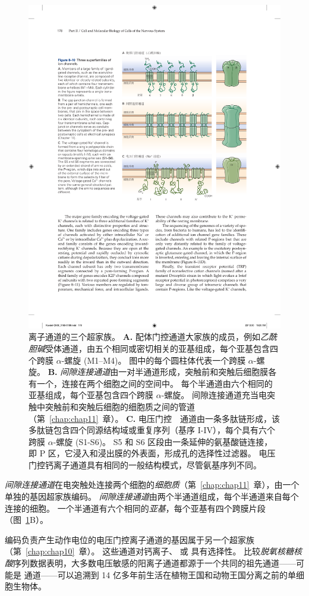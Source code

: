 \begin{figure}[htbp]
	\centering
	\includegraphics[width=0.7\linewidth]{chap08/fig_8_10}
	\caption{离子通道的三个超家族。 
		\textbf{A.} 配体门控通道大家族的成员，例如\textit{乙酰胆碱}受体通道，由五个相同或密切相关的亚基组成，每个亚基包含四个跨膜 $\alpha$-螺旋 (M1–M4)。
		图中的每个圆柱体代表一个跨膜 $\alpha$-螺旋。
		\textbf{B.} \textit{间隙连接通道}由一对半通道形成，突触前和突触后细胞膜各有一个，连接在两个细胞之间的空间中。
		每个半通道由六个相同的亚基组成，每个亚基包含四个跨膜 $\alpha$-螺旋。
		间隙连接通道充当电突触中突触前和突触后细胞的细胞质之间的管道（第~\ref{chap:chap11}~章）。
		\textbf{C.} 电压门控~~通道由一条多肽链形成，该多肽链包含四个同源结构域或重复序列（基序 I-IV），每个具有六个跨膜 $\alpha$-螺旋 (S1-S6)。
		S5 和 S6 区段由一条延伸的氨基酸链连接，即 P 区，它浸入和浸出膜的外表面，形成孔的选择性过滤器。
		电压门控钙离子通道具有相同的一般结构模式，尽管氨基序列不同。}
	\label{fig:8_10}
\end{figure}




\textit{间隙连接通道}在电突触处连接两个细胞的\textit{细胞质}（第~\ref{chap:chap11}~章），由一个单独的基因超家族编码。
\textit{间隙连接通道}由两个半通道组成，每个半通道来自每个连接的细胞。
一个半通道有六个相同的\textit{亚基}，每个亚基有四个跨膜片段（图~\ref{fig:8_10}B）。


编码负责产生动作电位的电压门控离子通道的基因属于另一个超家族（第~\ref{chap:chap10}~章）。
这些通道对钙离子、 或  具有选择性。
比较\textit{脱氧核糖核酸}序列数据表明，大多数电压敏感的阳离子通道都源于一个共同的祖先通道——可能是  通道——可以追溯到 14 亿多年前生活在植物王国和动物王国分离之前的单细胞生物体。


